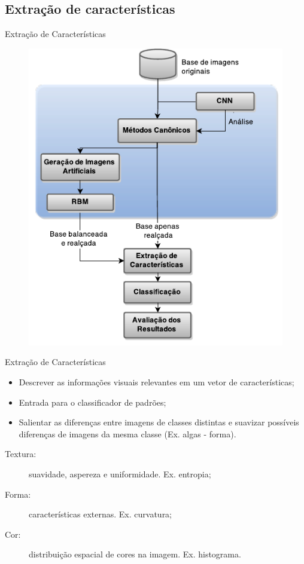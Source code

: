 \documentclass{beamer}
\begin{document}
\subsection{Extração de características}
\begin{frame}{Extração de Características}
\begin{figure}
    \includegraphics[height=0.75\textheight]{figuras/geral.pdf}
\end{figure}
\end{frame}
\begin{frame}{Extração de Características}
\setlength\leftmargini{0em}
\justifying
\begin{itemize}
\item Descrever as informações visuais relevantes em um vetor de características;
\item Entrada para o classificador de padrões;
\item Salientar as diferenças entre imagens de classes distintas e suavizar possíveis diferenças de imagens da mesma classe (Ex. algas - forma).
\end{itemize}
\setlength\leftmargini{0em}
\begin{description}
\item [Textura:] suavidade, aspereza e uniformidade. Ex. entropia;
\item [Forma:] características externas. Ex. curvatura;
\item [Cor:] distribuição espacial de cores na imagem. Ex. histograma.
\end{description}
\end{frame}
\end{document}
